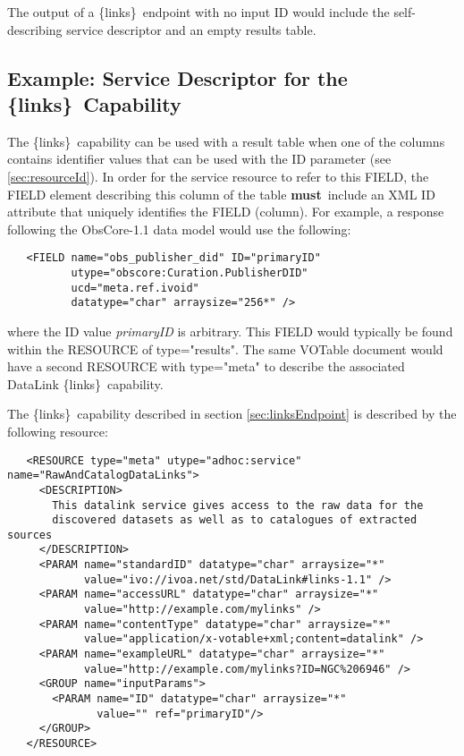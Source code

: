 \documentclass[11pt,a4paper]{ivoa}
\newcommand{\blinks}{\{links\}}
\newcommand{\attval}[2]{#1={\allowbreak}{"}#2{"}}
\newcommand{\rfcmust}{\textbf{must}}
\begin{document}
The output of a \blinks\ endpoint with no input ID would include the
self-describing service descriptor and an empty results table.


\subsection{Example: Service Descriptor for the \blinks\ Capability}
\label{sec:servDescBlinks}

The \blinks\ capability can be used with a result table when one of the
columns contains identifier values that can be used with the ID parameter
(see \ref{sec:resourceId}).
In order for the service resource to refer to this FIELD,
the FIELD element describing this column of the table
\rfcmust\ include an XML ID attribute
that uniquely identifies the FIELD (column).
For example, a response following the ObsCore-1.1 data model
would use the following:
\begin{verbatim}
   <FIELD name="obs_publisher_did" ID="primaryID"
          utype="obscore:Curation.PublisherDID"
          ucd="meta.ref.ivoid"
          datatype="char" arraysize="256*" />
\end{verbatim}
where the ID value {\em primaryID\/} is arbitrary.
This FIELD would typically
be found within the RESOURCE of \attval{type}{results}. The same VOTable
document would have a second RESOURCE with \attval{type}{meta} to describe
the associated DataLink \blinks\ capability.

The \blinks\ capability described in section \ref{sec:linksEndpoint}
is described by the following resource:
\begin{verbatim}
   <RESOURCE type="meta" utype="adhoc:service" name="RawAndCatalogDataLinks">
     <DESCRIPTION>
       This datalink service gives access to the raw data for the
       discovered datasets as well as to catalogues of extracted sources
     </DESCRIPTION>
     <PARAM name="standardID" datatype="char" arraysize="*"
            value="ivo://ivoa.net/std/DataLink#links-1.1" />
     <PARAM name="accessURL" datatype="char" arraysize="*"
            value="http://example.com/mylinks" />
     <PARAM name="contentType" datatype="char" arraysize="*"
            value="application/x-votable+xml;content=datalink" />
     <PARAM name="exampleURL" datatype="char" arraysize="*"
            value="http://example.com/mylinks?ID=NGC%206946" />
     <GROUP name="inputParams">
       <PARAM name="ID" datatype="char" arraysize="*"
              value="" ref="primaryID"/>
     </GROUP>
   </RESOURCE>
\end{verbatim}
\end{document}
